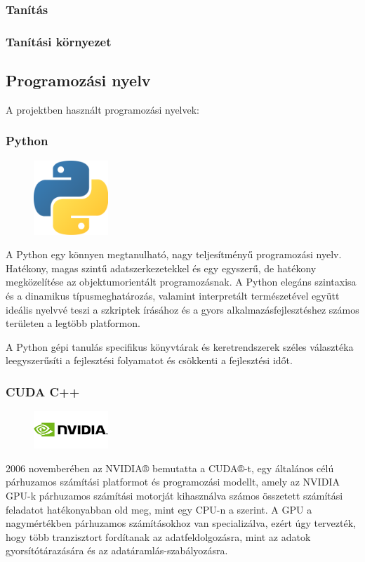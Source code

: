 \documentclass[12pt,a4]{article}
\begin{document}
	\subsubsection{Tanítás}
	
	\subsubsection{Tanítási környezet}
	
	
	
	\subsection{Programozási nyelv}
	A projektben használt programozási nyelvek:
	\subsubsection{Python}
	\begin{figure}
		\centering
		\includegraphics[width=0.25\textwidth]{python}
	\end{figure}
	\cite{python}A Python egy könnyen megtanulható, nagy teljesítményű programozási nyelv. Hatékony, magas szintű adatszerkezetekkel és egy egyszerű,
	de hatékony megközelítése az objektumorientált programozásnak. A Python elegáns szintaxisa és a dinamikus típusmeghatározás, valamint 
	interpretált természetével együtt ideális nyelvvé teszi a szkriptek írásához és a gyors alkalmazásfejlesztéshez számos területen a legtöbb platformon.
	
	A Python gépi tanulás specifikus könyvtárak és keretrendszerek széles választéka leegyszerűsíti a fejlesztési folyamatot és csökkenti a fejlesztési időt.
	
	\subsubsection{CUDA C++}
	\setlength\intextsep{12pt}
	\begin{figure}
		\centering
		\includegraphics[width=0.25\textwidth]{cuda}
	\end{figure}
	2006 novemberében az NVIDIA® bemutatta a CUDA®-t, egy általános célú párhuzamos számítási platformot és programozási modellt, amely az NVIDIA GPU-k párhuzamos számítási motorját kihasználva számos összetett számítási feladatot hatékonyabban old meg, mint egy CPU-n a \cite{cuda} szerint. A GPU a nagymértékben párhuzamos számításokhoz van specializálva, ezért úgy tervezték, hogy több tranzisztort fordítanak az adatfeldolgozásra, mint az adatok gyorsítótárazására és az adatáramlás-szabályozásra. 
	
\end{document}
